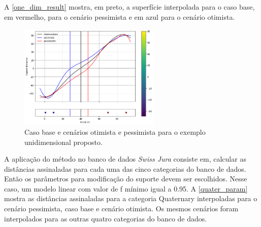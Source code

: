 A \autoref{one_dim_result} mostra, em preto, a superfície interpolada para o caso base, em vermelho, para o cenário pessimista e em azul para o cenário otimista. 
 
\begin{figure}[H]
	\caption{\label{one_dim_result} Caso base e cenários otimista e pessimista para o exemplo unidimensional proposto.}
	\centering
		\includegraphics[width=0.6\textwidth]{capitulo_3/imagens/all_kernels.png}
\end{figure}

A aplicação do método no banco de dados \textit{Swiss Jura} consiste em, calcular as distâncias assinaladas para cada uma das cinco categorias do banco de dados. Então os parâmetros para modificação do suporte devem ser escolhidos. Nesse caso, um modelo linear com valor de f mínimo igual a 0.95. A \autoref{quater_param} mostra as distâncias assinaladas para a categoria Quaternary interpoladas para o cenário pessimista, caso base e cenário otimista. Os mesmos cenários foram interpolados para as outras quatro categorias do banco de dados.

